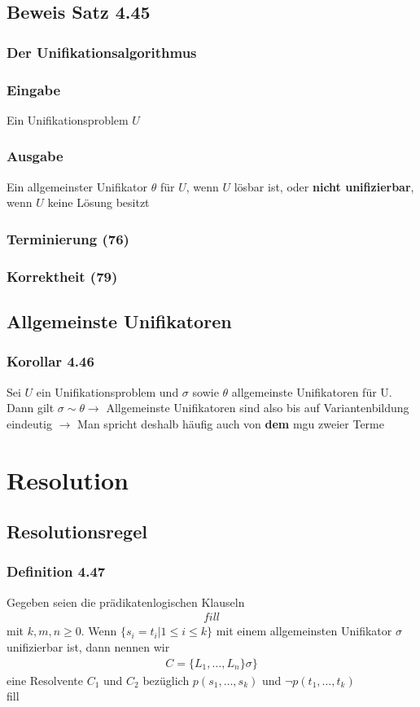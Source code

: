 \subsection{Beweis Satz 4.45}
\subsubsection{Der Unifikationsalgorithmus}
\subsubsection{Eingabe}
Ein Unifikationsproblem \(U\)
\subsubsection{Ausgabe}
Ein allgemeinster Unifikator \(\theta\) für \(U\), wenn \(U\) lösbar ist, oder \textbf{nicht unifizierbar}, wenn \(U\) keine Lösung besitzt
\subsubsection{Terminierung (76)}
\subsubsection{Korrektheit (79)}
\subsection{Allgemeinste Unifikatoren}
\subsubsection{Korollar 4.46}
Sei \(U\) ein Unifikationsproblem und \(\sigma\) sowie \(\theta\) allgemeinste Unifikatoren für U. Dann gilt \(\sigma \sim \theta \to \) Allgemeinste Unifikatoren sind also bis auf Variantenbildung eindeutig \(\to\) Man spricht deshalb häufig auch von \textbf{dem} mgu zweier Terme

\section{Resolution}
\subsection{Resolutionsregel}
\subsubsection{Definition 4.47}
Gegeben seien die prädikatenlogischen Klauseln
\begin{align*}
fill
\end{align*}
mit \(k,m,n \ge 0\). Wenn \(\{s_i= t_i| 1 \le i \le k\}\) mit einem allgemeinsten Unifikator \(\sigma\) unifizierbar ist, dann nennen wir 
\begin{align*}
	C = \{L_1, \ldots, L_n\}\sigma\}
\end{align*}
eine Resolvente \(C_1\) und \(C_2\) bezüglich \(p(s_1, \ldots , s_k)\) und \(\neg p (t_1, \ldots , t_k)\) \\
fill
